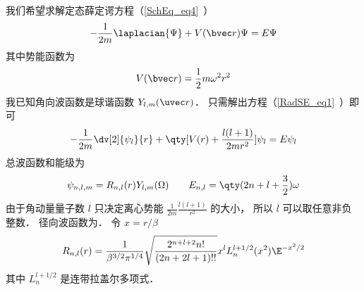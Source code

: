 
\begin{issues}
\issueDraft
\end{issues}


我们希望求解定态薛定谔方程（\autoref{SchEq_eq4}~）
\begin{equation}
-\frac{1}{2m} \laplacian {\Psi} + V(\bvec r)\Psi = E \Psi
\end{equation}
其中势能函数为
\begin{equation}
V(\bvec r) = \frac{1}{2}m\omega^2 r^2
\end{equation}
我已知角向波函数是球谐函数 $Y_{l,m}(\uvec r)$． 只需解出方程（\autoref{RadSE_eq1}~）即可
\begin{equation}
-\frac{1}{2m} \dv[2]{\psi_l}{r} + \qty[V(r) + \frac{l(l + 1)}{2mr^2}]\psi_l = E\psi_l
\end{equation}
总波函数和能级为
\begin{equation}
\psi_{n,l,m} = R_{n,l}(r) Y_{l,m}(\Omega)
\qquad
E_{n,l} = \qty(2n + l + \frac32) \omega
\end{equation}    
由于角动量量子数 $l$ 只决定离心势能 $\frac{1}{2m} \frac{l(l + 1)}{r^2}$  的大小， 所以 $l$ 可以取任意非负整数． 径向波函数为． 令 $x = r/\beta $
\begin{equation}
R_{n,l}(r) = \frac{1}{\beta^{3/2} \pi^{1/4}} \sqrt{\frac{2^{n+l+2} n!}{(2n + 2l + 1)!!}} x^l L_n^{l+1/2}(x^2) \E^{-x^2/2}
\end{equation}
其中 $L_n^{l+1/2}$ 是连带拉盖尔多项式．

